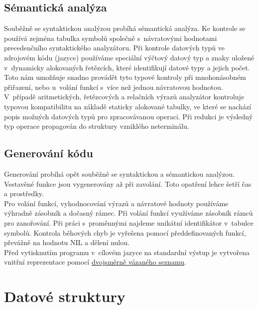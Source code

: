 \documentclass[11pt]{article}
\begin{document}
	\subsection{Sémantická analýza}
    	Souběžně se syntaktickou analýzou probíhá sémantická analýza. Ke kontrole se používá zejména
    	tabulka symbolů společně s~návratovými hodnotami precedenčního syntaktického analyzátoru. Při
    	kontrole datových typů ve zdrojovém kódu (jazyce) používáme speciální výčtový datový typ a znaky
    	uložené v~dynamicky alokovaných řetězcích, které identifikují datové typy a jejich počet. Toto
    	nám umožňuje snadno provádět tyto typové kontroly při mnohonásobném přiřazení, nebo u~volání funkcí s~více
    	než jednou návratovou hodnotou. \\
    	\indent V~případě aritmetických, řetězcových a relačních výrazů	 analyzátor kontroluje typovou
    	kompatibilitu na základě staticky alokované tabulky, ve které se nachází popis možných datových
    	typů pro zpracovávanou operaci. Při redukci je výsledný typ operace propagován do struktury
    	vzniklého neterminálu.
    	
        \pagebreak
        
    
	\subsection{Generování kódu}
	    Generování probíhá opět souběžně se syntaktickou a sémantickou analýzou. Vestavěné funkce
	    jsou vygenerovány až při zavolání. Toto opatření lehce šetří čas a prostředky. \\
	    \indent Pro volání funkcí, vyhodnocování výrazů a návratové hodnoty používáme výhradně zásobník a
	    dočasný rámec. Při volání funkcí využíváme zásobník rámců pro zanořování. Při práci s~proměnnými
	    najdeme unikátní identifikátor v~tabulce symbolů. Kontrola běhových chyb je vyřešena pomocí
	    předdefinovaných funkcí, převážně na hodnotu NIL a dělení nulou. \\
	    \indent Před vytisknutím programu v~cílovém jazyce na standardní výstup je vytvořena vnitřní
	    reprezentace pomocí \hyperref[sec:dll]{dvojsměrně vázaného seznamu}. 
	    
	\vspace{5mm}
    \section{Datové struktury}
    
\end{document}

